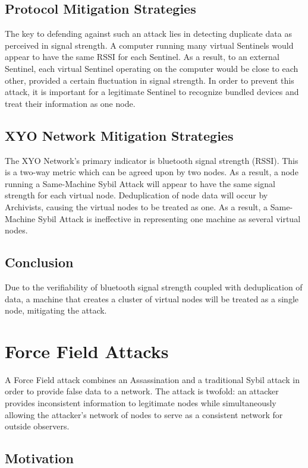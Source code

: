 \documentclass{article}
\begin{document}
\subsection{Protocol Mitigation Strategies}

The key to defending against such an attack lies in detecting duplicate data as perceived in signal strength. A computer running many virtual Sentinels would appear to have the same RSSI for each Sentinel. As a result, to an external Sentinel, each virtual Sentinel operating on the computer would be close to each other, provided a certain fluctuation in signal strength. In order to prevent this attack, it is important for a legitimate Sentinel to recognize bundled devices and treat their information as one node.

\subsection{XYO Network Mitigation Strategies}

The XYO Network's primary indicator is bluetooth signal strength (RSSI). This is a two-way metric which can be agreed upon by two nodes. As a result, a node running a Same-Machine Sybil Attack will appear to have the same signal strength for each virtual node. Deduplication of node data will occur by Archivists, causing the virtual nodes to be treated as one. As a result, a Same-Machine Sybil Attack is ineffective in representing one machine as several virtual nodes.

\subsection{Conclusion}

Due to the verifiability of bluetooth signal strength coupled with deduplication of data, a machine that creates a cluster of virtual nodes will be treated as a single node, mitigating the attack.

\section{Force Field Attacks}
A Force Field attack combines an Assassination and a traditional Sybil attack in order to provide false data to a network. The attack is twofold: an attacker provides inconsistent information to legitimate nodes while simultaneously allowing the attacker's network of nodes to serve as a consistent network for outside observers.

\subsection{Motivation}
\end{document}
